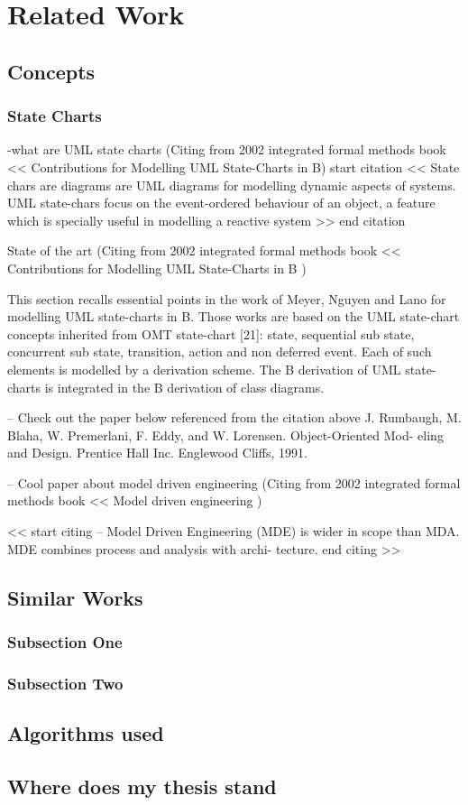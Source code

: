 \chapter{Related Work}

\section{Concepts}

\subsection{State Charts}
-what are UML state charts (Citing from 2002 integrated formal methods book << Contributions for Modelling UML State-Charts in B)
start citation << 
State chars are diagrams are UML diagrams for modelling dynamic aspects of systems. UML state-chars focus on the event-ordered behaviour of an object, a feature which is specially useful in modelling a reactive system   >> end citation

State of the art (Citing from 2002 integrated formal methods book  << Contributions for Modelling UML State-Charts in B )

This section recalls essential points in the work of Meyer, Nguyen and Lano for modelling
UML state-charts in B. Those works are based on the UML state-chart concepts inherited
from OMT state-chart [21]: state, sequential sub state, concurrent sub state, transition,
action and non deferred event. Each of such elements is modelled by a derivation scheme.
The B derivation of UML state-charts is integrated in the B derivation of class diagrams.

-- Check out the paper below referenced from the citation above
J. Rumbaugh, M. Blaha, W. Premerlani, F. Eddy, and W. Lorensen. Object-Oriented Mod-
eling and Design. Prentice Hall Inc. Englewood Cliffs, 1991.


-- Cool paper about model driven engineering (Citing from 2002 integrated formal methods book  << Model driven engineering )

<< start citing  --  Model Driven Engineering (MDE) is wider
in scope than MDA. MDE combines process and analysis with archi-
tecture. end citing >>




\section{Similar Works}

\subsection{Subsection One}

\subsection{Subsection Two}


\section{Algorithms used}
	
\section{Where does my thesis stand}



